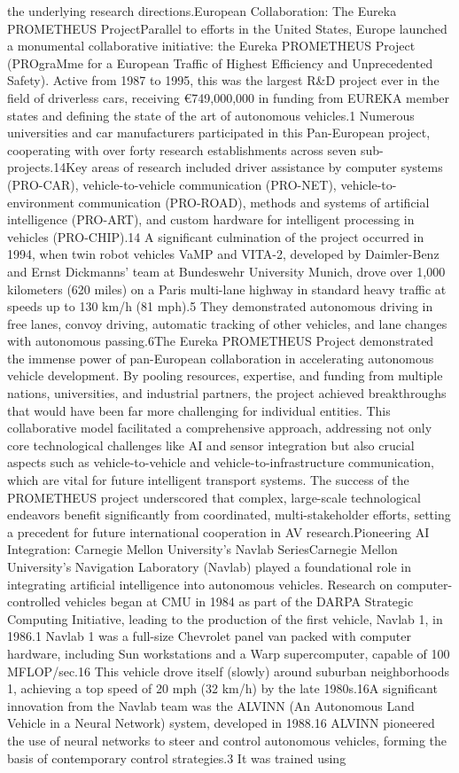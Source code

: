 the underlying research directions.European Collaboration: The Eureka PROMETHEUS ProjectParallel to efforts in the United States, Europe launched a monumental collaborative initiative: the Eureka PROMETHEUS Project (PROgraMme for a European Traffic of Highest Efficiency and Unprecedented Safety). Active from 1987 to 1995, this was the largest R&D project ever in the field of driverless cars, receiving €749,000,000 in funding from EUREKA member states and defining the state of the art of autonomous vehicles.1 Numerous universities and car manufacturers participated in this Pan-European project, cooperating with over forty research establishments across seven sub-projects.14Key areas of research included driver assistance by computer systems (PRO-CAR), vehicle-to-vehicle communication (PRO-NET), vehicle-to-environment communication (PRO-ROAD), methods and systems of artificial intelligence (PRO-ART), and custom hardware for intelligent processing in vehicles (PRO-CHIP).14 A significant culmination of the project occurred in 1994, when twin robot vehicles VaMP and VITA-2, developed by Daimler-Benz and Ernst Dickmanns' team at Bundeswehr University Munich, drove over 1,000 kilometers (620 miles) on a Paris multi-lane highway in standard heavy traffic at speeds up to 130 km/h (81 mph).5 They demonstrated autonomous driving in free lanes, convoy driving, automatic tracking of other vehicles, and lane changes with autonomous passing.6The Eureka PROMETHEUS Project demonstrated the immense power of pan-European collaboration in accelerating autonomous vehicle development. By pooling resources, expertise, and funding from multiple nations, universities, and industrial partners, the project achieved breakthroughs that would have been far more challenging for individual entities. This collaborative model facilitated a comprehensive approach, addressing not only core technological challenges like AI and sensor integration but also crucial aspects such as vehicle-to-vehicle and vehicle-to-infrastructure communication, which are vital for future intelligent transport systems. The success of the PROMETHEUS project underscored that complex, large-scale technological endeavors benefit significantly from coordinated, multi-stakeholder efforts, setting a precedent for future international cooperation in AV research.Pioneering AI Integration: Carnegie Mellon University's Navlab SeriesCarnegie Mellon University's Navigation Laboratory (Navlab) played a foundational role in integrating artificial intelligence into autonomous vehicles. Research on computer-controlled vehicles began at CMU in 1984 as part of the DARPA Strategic Computing Initiative, leading to the production of the first vehicle, Navlab 1, in 1986.1 Navlab 1 was a full-size Chevrolet panel van packed with computer hardware, including Sun workstations and a Warp supercomputer, capable of 100 MFLOP/sec.16 This vehicle drove itself (slowly) around suburban neighborhoods 1, achieving a top speed of 20 mph (32 km/h) by the late 1980s.16A significant innovation from the Navlab team was the ALVINN (An Autonomous Land Vehicle in a Neural Network) system, developed in 1988.16 ALVINN pioneered the use of neural networks to steer and control autonomous vehicles, forming the basis of contemporary control strategies.3 It was trained using 